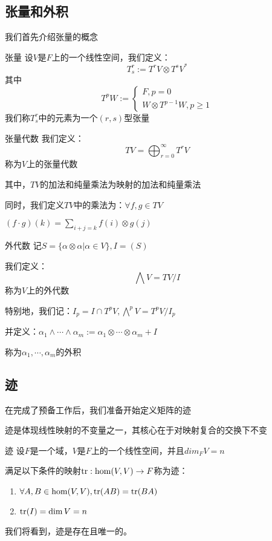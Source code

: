 \documentclass[12pt, a4paper, oneside, UTF8]{ctexbook}
\begin{document}
		\subsection{张量和外积}
			我们首先介绍张量的概念
			\begin{defn}{张量}{}
				设$V$是$F$上的一个线性空间，我们定义：
				\begin{equation}
					T_{s}^{r}:= T^{r} V \otimes T^{s} V^*
				\end{equation}
				其中
				\begin{equation}
					T^{p} W:= \begin{cases}
						F,p=0 \\
						W \otimes T^{p-1} W,p \geqslant 1
					\end{cases}
				\end{equation}
				我们称$T_{s}^{r}$中的元素为一个$(r,s)$型张量
			\end{defn}
			\begin{defn}{张量代数}{}
				我们定义：
				\begin{equation}
					TV = \bigoplus_{r=0}^{\infty} T^{r} V
				\end{equation}
				称为$V$上的张量代数

				其中，$TV$的加法和纯量乘法为映射的加法和纯量乘法

				同时，我们定义$TV$中的乘法为：$\forall f,g \in TV$

				$(f\cdot g)(k)=\sum\limits_{i+j=k} f(i) \otimes g(j)$
			\end{defn}
			\begin{defn}{外代数}{}
				记$S=\{\alpha \otimes \alpha |\alpha \in V\},I=(S)$

				我们定义：
				\begin{equation}
					\bigwedge  V = TV / I
				\end{equation}
				称为$V$上的外代数

				特别地，我们记：$I_p = I \cap T^{p} V,\bigwedge\limits^{p} V = T^{p}V/I_p$

				并定义：$\alpha_1 \wedge \cdots \wedge \alpha_m := \alpha_1 \otimes \cdots \otimes \alpha_m + I$

				称为$\alpha_1,\cdots,\alpha_m$的外积
			\end{defn}
		\subsection{迹}
			在完成了预备工作后，我们准备开始定义矩阵的迹

			迹是体现线性映射的不变量之一，其核心在于对映射复合的交换下不变
			\begin{defn}{迹}{}
				设$F$是一个域，$V$是$F$上的一个线性空间，并且$dim_F V = n$

				满足以下条件的映射$\operatorname{tr}:\hom(V,V) \to F$称为迹：
				\begin{enumerate}
					\item $\forall A,B \in \hom(V,V),\operatorname{tr}(AB)=\operatorname{tr}(BA)$
					\item $\operatorname{tr}(I)=\dim V = n$
				\end{enumerate}
			\end{defn}
			我们将看到，迹是存在且唯一的。
\end{document}
